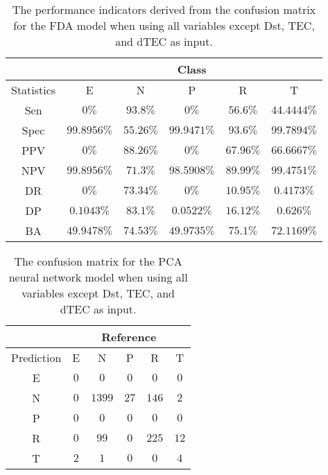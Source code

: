 \begin{table}[!ht]
	\centering
	\begin{tabular}{|c|c|c|c|c|c|}
		\hline
		 & \multicolumn{5}{c|}{Class} \\ \hline
		Statistics & E & N & P & R & T \\ \hline
		Sen & $0\%$ & $93.8\%$ & $0\%$ & $56.6\%$ & $44.4444\%$ \\ \hline
		Spec & $99.8956\%$ & $55.26\%$ & $99.9471\%$ & $93.6\%$ & $99.7894\%$ \\ \hline
		PPV & $0\%$ & $88.26\%$ & $0\%$ & $67.96\%$ & $66.6667\%$ \\ \hline
		NPV & $99.8956\%$ & $71.3\%$ & $98.5908\%$ & $89.99\%$ & $99.4751\%$ \\ \hline
		DR & $0\%$ & $73.34\%$ & $0\%$ & $10.95\%$ & $0.4173\%$ \\ \hline
		DP & $0.1043\%$ & $83.1\%$ & $0.0522\%$ & $16.12\%$ & $0.626\%$ \\ \hline
		BA & $49.9478\%$ & $74.53\%$ & $49.9735\%$ & $75.1\%$ & $72.1169\%$ \\ \hline
	\end{tabular}
	\caption{The performance indicators derived from the confusion matrix for the FDA model when using all variables except Dst, TEC, and dTEC as input.}
	\label{tab:cs:reverse:noTEC:fda}
\end{table}

\begin{table}[!ht]
	\centering
	\begin{tabular}{|c|c|c|c|c|c|}
		\hline
		 & \multicolumn{5}{|c|}{Reference} \\ \hline
		 Prediction & E & N & P & R & T \\ \hline
		 E & $0$ & $0$ & $0$ & $0$ & $0$ \\ \hline
		 N & $0$ & $1399$ & $27$ & $146$ & $2$ \\ \hline
		 P & $0$ & $0$ & $0$ & $0$ & $0$ \\ \hline
		 R & $0$ & $99$ & $0$ & $225$ & $12$ \\ \hline
		 T & $2$ & $1$ & $0$ & $0$ & $4$ \\ \hline
	\end{tabular}
	\caption{The confusion matrix for the PCA neural network model when using all variables except Dst, TEC, and dTEC as input.}
	\label{tab:cm:noTEC:pcaNNet}
\end{table}

